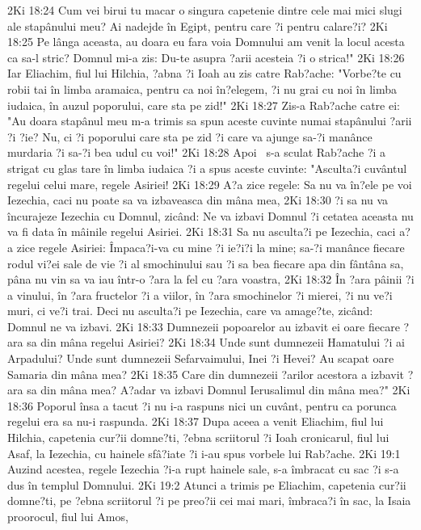 2Ki 18:24  Cum vei birui tu macar o singura capetenie dintre cele mai mici slugi ale stapânului meu? Ai nadejde în Egipt, pentru care ?i pentru calare?i?
2Ki 18:25  Pe lânga aceasta, au doara eu fara voia Domnului am venit la locul acesta ca sa-l stric? Domnul mi-a zis: Du-te asupra ?arii acesteia ?i o strica!"
2Ki 18:26  Iar Eliachim, fiul lui Hilchia, ?abna ?i Ioah au zis catre Rab?ache: "Vorbe?te cu robii tai în limba aramaica, pentru ca noi în?elegem, ?i nu grai cu noi în limba iudaica, în auzul poporului, care sta pe zid!"
2Ki 18:27  Zis-a Rab?ache catre ei: "Au doara stapânul meu m-a trimis sa spun aceste cuvinte numai stapânului ?arii ?i ?ie? Nu, ci ?i poporului care sta pe zid ?i care va ajunge sa-?i manânce murdaria ?i sa-?i bea udul cu voi!"
2Ki 18:28  Apoi  s-a sculat Rab?ache ?i a strigat cu glas tare în limba iudaica ?i a spus aceste cuvinte: "Asculta?i cuvântul regelui celui mare, regele Asiriei!
2Ki 18:29  A?a zice regele: Sa nu va în?ele pe voi Iezechia, caci nu poate sa va izbaveasca din mâna mea,
2Ki 18:30  ?i sa nu va încurajeze Iezechia cu Domnul, zicând: Ne va izbavi Domnul ?i cetatea aceasta nu va fi data în mâinile regelui Asiriei.
2Ki 18:31  Sa nu asculta?i pe Iezechia, caci a?a zice regele Asiriei: Împaca?i-va cu mine ?i ie?i?i la mine; sa-?i manânce fiecare rodul vi?ei sale de vie ?i al smochinului sau ?i sa bea fiecare apa din fântâna sa, pâna nu vin sa va iau într-o ?ara la fel cu ?ara voastra,
2Ki 18:32  În ?ara pâinii ?i a vinului, în ?ara fructelor ?i a viilor, în ?ara smochinelor ?i mierei, ?i nu ve?i muri, ci ve?i trai. Deci nu asculta?i pe Iezechia, care va amage?te, zicând: Domnul ne va izbavi.
2Ki 18:33  Dumnezeii popoarelor au izbavit ei oare fiecare ?ara sa din mâna regelui Asiriei?
2Ki 18:34  Unde sunt dumnezeii Hamatului ?i ai Arpadului? Unde sunt dumnezeii Sefarvaimului, Inei ?i Hevei? Au scapat oare Samaria din mâna mea?
2Ki 18:35  Care din dumnezeii ?arilor acestora a izbavit ?ara sa din mâna mea? A?adar va izbavi Domnul Ierusalimul din mâna mea?"
2Ki 18:36  Poporul însa a tacut ?i nu i-a raspuns nici un cuvânt, pentru ca porunca regelui era sa nu-i raspunda.
2Ki 18:37  Dupa aceea a venit Eliachim, fiul lui Hilchia, capetenia cur?ii domne?ti, ?ebna scriitorul ?i Ioah cronicarul, fiul lui Asaf, la Iezechia, cu hainele sfâ?iate ?i i-au spus vorbele lui Rab?ache.
2Ki 19:1  Auzind acestea, regele Iezechia ?i-a rupt hainele sale, s-a îmbracat cu sac ?i s-a dus în templul Domnului.
2Ki 19:2  Atunci a trimis pe Eliachim, capetenia cur?ii domne?ti, pe ?ebna scriitorul ?i pe preo?ii cei mai mari, îmbraca?i în sac, la Isaia proorocul, fiul lui Amos,
